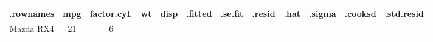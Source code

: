 \documentclass[]{article}
\theoremstyle{definition}
\theoremstyle{definition}
\theoremstyle{definition}
\theoremstyle{remark}
\begin{document}
\begin{longtable}[]{@{}cccccccccccc@{}}
\toprule
\begin{minipage}[b]{0.11\columnwidth}\centering\strut
.rownames\strut
\end{minipage} & \begin{minipage}[b]{0.04\columnwidth}\centering\strut
mpg\strut
\end{minipage} & \begin{minipage}[b]{0.08\columnwidth}\centering\strut
factor.cyl.\strut
\end{minipage} & \begin{minipage}[b]{0.04\columnwidth}\centering\strut
wt\strut
\end{minipage} & \begin{minipage}[b]{0.04\columnwidth}\centering\strut
disp\strut
\end{minipage} & \begin{minipage}[b]{0.05\columnwidth}\centering\strut
.fitted\strut
\end{minipage} & \begin{minipage}[b]{0.05\columnwidth}\centering\strut
.se.fit\strut
\end{minipage} & \begin{minipage}[b]{0.05\columnwidth}\centering\strut
.resid\strut
\end{minipage} & \begin{minipage}[b]{0.05\columnwidth}\centering\strut
.hat\strut
\end{minipage} & \begin{minipage}[b]{0.05\columnwidth}\centering\strut
.sigma\strut
\end{minipage} & \begin{minipage}[b]{0.06\columnwidth}\centering\strut
.cooksd\strut
\end{minipage} & \begin{minipage}[b]{0.06\columnwidth}\centering\strut
.std.resid\strut
\end{minipage}\tabularnewline
\midrule
\endhead
\begin{minipage}[t]{0.11\columnwidth}\centering\strut
Mazda RX4\strut
\end{minipage} & \begin{minipage}[t]{0.04\columnwidth}\centering\strut
21\strut
\end{minipage} & \begin{minipage}[t]{0.08\columnwidth}\centering\strut
6\strut
\end{minipage} & \begin{minipage}[t]{0.04\columnwidth}\centering\strut

\end{minipage}
\end{longtable}
\end{document}
